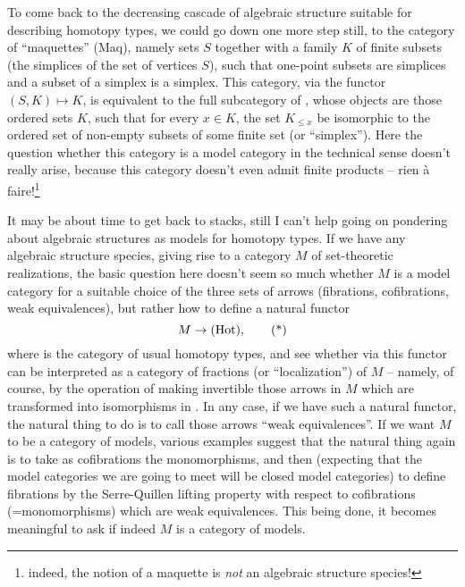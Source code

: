 To come back to the decreasing cascade of algebraic structure suitable
for describing homotopy types, we could go down one more step still,
to the category of ``maquettes'' (Maq), namely sets $S$ together with
a family $K$ of finite subsets (the simplices of the set of
vertices $S$), such that one-point subsets are simplices
and a subset of a simplex is a simplex. This category, via the functor
$(S,K) \mapsto K$, is equivalent to the full subcategory of \Ord,
whose objects are those ordered sets $K$, such that for every $x\in
K$, the set $K_{\le x}$ be isomorphic to the ordered set of non-empty
subsets of some finite set (or ``simplex''). Here the question whether
this category is a model category in the technical sense doesn't
really arise, because this category doesn't even admit finite products
-- rien \`a faire!\footnote{ indeed, the notion of a maquette is
  \emph{not} an algebraic structure species!}

\clearpage

\label{sec:23}%
It may be about time to get back to stacks, still I can't help going
on pondering about algebraic structures as models for homotopy
types. If we have any algebraic structure species, giving rise to a
category $M$ of set-theoretic realizations, the basic question here
doesn't seem so much whether $M$ is a model category for a suitable
choice of the three sets of arrows (fibrations, cofibrations, weak
equivalences), but rather how to define a natural functor
\begin{equation}
  \label{eq:23.star}
  M \to {\ensuremath{(\mathrm{Hot})}}, \tag{*}
\end{equation}
where \Hot{} is the category of usual homotopy types, and see whether
via this functor \Hot{} can be interpreted as a category of fractions
(or ``localization'') of $M$ -- namely, of course, by the operation of
making invertible those arrows in $M$ which are transformed into
isomorphisms in \Hot{}. In any case, if we have such a natural functor,
the natural thing to do is to call those arrows ``weak
equivalences''. If we want $M$ to be a category of models, various
examples suggest that the natural thing again is to take as
cofibrations the monomorphisms, and then (expecting that the model
categories we are going to meet will be closed model categories) to
define fibrations by the Serre-Quillen lifting property with respect
to cofibrations (=monomorphisms) which are weak equivalences. This
being done, it becomes meaningful to ask if indeed $M$ is a category
of models.

